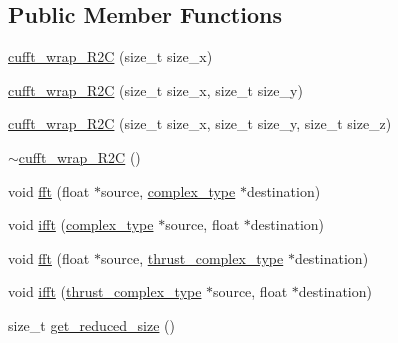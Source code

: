 \subsection*{Public Member Functions}
\begin{DoxyCompactItemize}
\item 
\hyperlink{classcufft__wrap__R2C_3_01float_01_4_adda8432f06cf7e3bd1caba1e1fa9a32b}{cufft\-\_\-wrap\-\_\-\-R2\-C} (size\-\_\-t size\-\_\-x)
\item 
\hyperlink{classcufft__wrap__R2C_3_01float_01_4_a83b29d23660da663a3d7b388a5a1d387}{cufft\-\_\-wrap\-\_\-\-R2\-C} (size\-\_\-t size\-\_\-x, size\-\_\-t size\-\_\-y)
\item 
\hyperlink{classcufft__wrap__R2C_3_01float_01_4_ae930d8483f1d7b4a82654080623ea4d3}{cufft\-\_\-wrap\-\_\-\-R2\-C} (size\-\_\-t size\-\_\-x, size\-\_\-t size\-\_\-y, size\-\_\-t size\-\_\-z)
\item 
\hyperlink{classcufft__wrap__R2C_3_01float_01_4_a962025f8ee2a5aa3aae2b75e393a6687}{$\sim$cufft\-\_\-wrap\-\_\-\-R2\-C} ()
\item 
void \hyperlink{classcufft__wrap__R2C_3_01float_01_4_ad16ae820d1bfaaabe4487f9d66dd16d8}{fft} (float $\ast$source, \hyperlink{classcufft__wrap__R2C_3_01float_01_4_a440b94a9e77e57995d6667008b1b4adc}{complex\-\_\-type} $\ast$destination)
\item 
void \hyperlink{classcufft__wrap__R2C_3_01float_01_4_a41fc400f6fc649079432264820fefc6a}{ifft} (\hyperlink{classcufft__wrap__R2C_3_01float_01_4_a440b94a9e77e57995d6667008b1b4adc}{complex\-\_\-type} $\ast$source, float $\ast$destination)
\item 
void \hyperlink{classcufft__wrap__R2C_3_01float_01_4_a21db7ac4a7fdc2761def4728565cd3f3}{fft} (float $\ast$source, \hyperlink{classcufft__wrap__R2C_3_01float_01_4_a6b4db0bf9b878d0d81cfbe7b84d1c5d3}{thrust\-\_\-complex\-\_\-type} $\ast$destination)
\item 
void \hyperlink{classcufft__wrap__R2C_3_01float_01_4_a5e497ec32a9a5ad4f3fce384e6b6e3ae}{ifft} (\hyperlink{classcufft__wrap__R2C_3_01float_01_4_a6b4db0bf9b878d0d81cfbe7b84d1c5d3}{thrust\-\_\-complex\-\_\-type} $\ast$source, float $\ast$destination)
\item 
size\-\_\-t \hyperlink{classcufft__wrap__R2C_3_01float_01_4_a5715b0207ba8fa81fab49191d54e66df}{get\-\_\-reduced\-\_\-size} ()
\end{DoxyCompactItemize}


